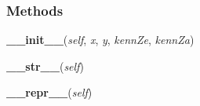 
  \subsubsection{Methods}

    \label{Land:Land:__init__}

    \vspace{0.5ex}

\hspace{.8\funcindent}\begin{boxedminipage}{\funcwidth}

    \raggedright \textbf{\_\_init\_\_}(\textit{self}, \textit{x}, \textit{y}, \textit{kennZe}, \textit{kennZa})

\setlength{\parskip}{2ex}
\setlength{\parskip}{1ex}
    \end{boxedminipage}

    \label{Land:Land:__str__}

    \vspace{0.5ex}

\hspace{.8\funcindent}\begin{boxedminipage}{\funcwidth}

    \raggedright \textbf{\_\_str\_\_}(\textit{self})

\setlength{\parskip}{2ex}
\setlength{\parskip}{1ex}
    \end{boxedminipage}

    \label{Land:Land:__repr__}

    \vspace{0.5ex}

\hspace{.8\funcindent}\begin{boxedminipage}{\funcwidth}

    \raggedright \textbf{\_\_repr\_\_}(\textit{self})

\setlength{\parskip}{2ex}
\setlength{\parskip}{1ex}
    \end{boxedminipage}


